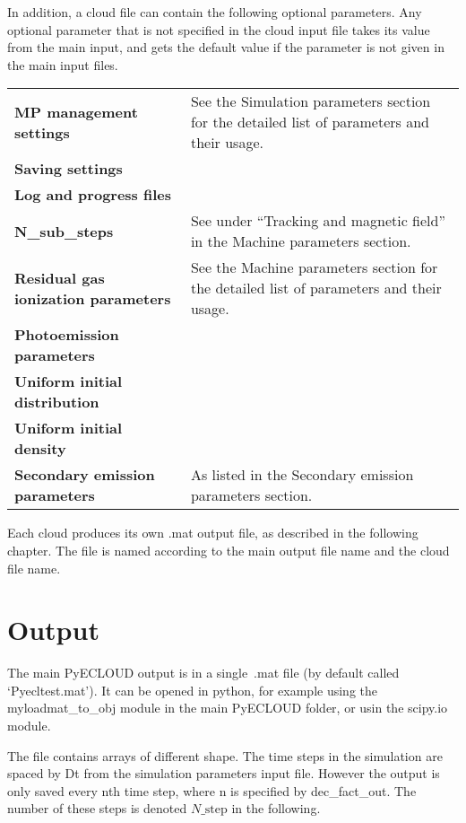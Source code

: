 \documentclass[a4paper,12pt]{article}
\begin{document}
In addition, a cloud file can contain the following optional parameters. Any optional parameter that is not specified in the cloud input file takes its value from the main input, and gets the default value if the parameter is not given in the main input files.

\begin{longtable}{p{}p{}}
\hline\endfirsthead\hline\endhead\rowcolor{Gray}
\multicolumn{2}{p{.97\textwidth}}{
\textbf{Optional cloud parameters}}\\ \hline
\textbf{MP management settings} & See the Simulation parameters section for the detailed list of parameters and their usage.\\
\textbf{Saving settings} &  \\
\textbf{Log and progress files} & \\ \hline
\textbf{N\_sub\_steps} & See under ``Tracking and magnetic field'' in the Machine parameters section.\\ \hline
\textbf{Residual gas ionization parameters} & See the Machine parameters section for the detailed list of parameters and their usage.\\
\textbf{Photoemission parameters} & \\
\textbf{Uniform initial distribution} & \\
\textbf{Uniform initial density} & \\ \hline
\textbf{Secondary emission parameters} & As listed in the Secondary emission parameters section.\\ \hline
\end{longtable}

Each cloud produces its own .mat output file, as described in the following chapter. The file is named according to the main output file name and the cloud file name.

\newpage

\section{Output}
The main PyECLOUD output is in a single~.mat file (by default called `Pyecltest.mat'). It can be opened in python, for example using the myloadmat\_to\_obj module in the main PyECLOUD folder, or usin the scipy.io module.

The file contains arrays of different shape.
The time steps in the simulation are spaced by Dt from the simulation parameters input file.
However the output is only saved every nth time step, where n is specified by dec\_fact\_out.
The number of these steps is denoted $N\_{\mathrm{step}}$ in the following.
\end{document}
